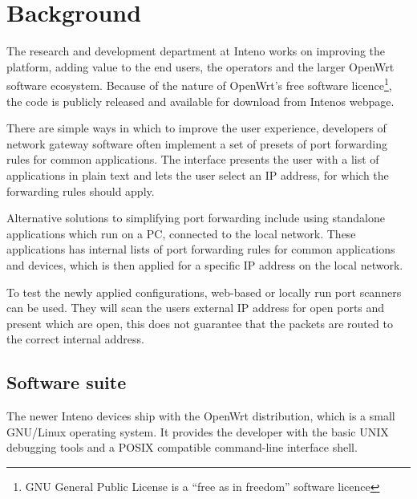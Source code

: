 \documentclass[a4paper,11pt]{kth-bcs}
\begin{document}

\chapter{Background}

The research and development department at Inteno works on improving the platform, adding value to the end users, the operators and the larger OpenWrt software ecosystem.
Because of the nature of OpenWrt's free software licence\footnote{GNU General Public License is a ``free as in freedom'' software licence}, the code is publicly released and available for download from Intenos webpage\cite{inteno_gpl}.

There are simple ways in which to improve the user experience, developers of network gateway software often implement a set of presets of port forwarding rules for common applications.
The interface presents the user with a list of applications in plain text and lets the user select an IP address, for which the forwarding rules should apply.

Alternative solutions to simplifying port forwarding include using standalone applications which run on a PC, connected to the local network.
These applications has internal lists of port forwarding rules for common applications and devices, which is then applied for a specific IP address on the local network.
\cite{portforward.com}


To test the newly applied configurations, web-based or locally run port scanners can be used.
They will scan the users external IP address for open ports and present which are open, this does not guarantee that the packets are routed to the correct internal address.

\section{Software suite}

The newer Inteno devices ship with the OpenWrt distribution, which is a small GNU/Linux operating system.
It provides the developer with the basic UNIX debugging tools and a POSIX compatible command-line interface shell.
\end{document}
